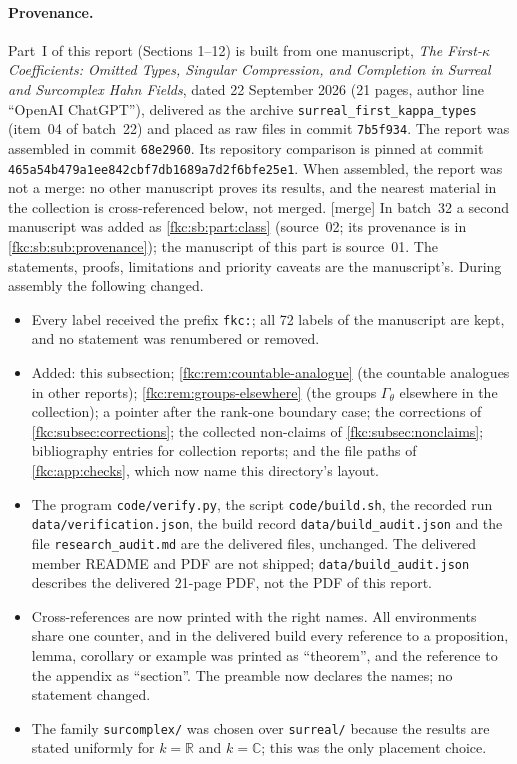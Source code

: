 \documentclass[11pt,letterpaper]{article}
\numberwithin{equation}{section}
\theoremstyle{definition}
\theoremstyle{remark}
\newcommand{\R}{\mathbb R}
\newcommand{\C}{\mathbb C}
\newcommand{\mergetag}{\textup{\textsf{\small[merge]}}}%
\begin{document}
\paragraph{Provenance.}
Part~I of this report (Sections 1--12) is built from one manuscript, \emph{The First-$\kappa$ Coefficients: Omitted Types, Singular Compression, and Completion in Surreal and Surcomplex Hahn Fields}, dated 22 September 2026 (21 pages, author line ``OpenAI ChatGPT''), delivered as the archive \texttt{surreal\_first\_kappa\_types} (item~04 of batch~22) and placed as raw files in commit \texttt{7b5f934}. The report was assembled in commit \texttt{68e2960}. Its repository comparison is pinned at commit \texttt{465a54b479a1ee842cbf7db1689a7d2f6bfe25e1}. When assembled, the report was not a merge: no other manuscript proves its results, and the nearest material in the collection is cross-referenced below, not merged. \mergetag{} In batch~32 a second manuscript was added as \cref{fkc:sb:part:class} (source~02; its provenance is in \cref{fkc:sb:sub:provenance}); the manuscript of this part is source~01. The statements, proofs, limitations and priority caveats are the manuscript's. During assembly the following changed.
\begin{itemize}
\item Every label received the prefix \texttt{fkc:}; all 72 labels of the manuscript are kept, and no statement was renumbered or removed.
\item Added: this subsection; \cref{fkc:rem:countable-analogue} (the countable analogues in other reports); \cref{fkc:rem:groups-elsewhere} (the groups $\Gamma_\theta$ elsewhere in the collection); a pointer after the rank-one boundary case; the corrections of \cref{fkc:subsec:corrections}; the collected non-claims of \cref{fkc:subsec:nonclaims}; bibliography entries for collection reports; and the file paths of \cref{fkc:app:checks}, which now name this directory's layout.
\item The program \texttt{code/verify.py}, the script \texttt{code/build.sh}, the recorded run \texttt{data/verification.json}, the build record \texttt{data/build\_audit.json} and the file \texttt{research\_audit.md} are the delivered files, unchanged. The delivered member README and PDF are not shipped; \texttt{data/build\_audit.json} describes the delivered 21-page PDF, not the PDF of this report.
\item Cross-references are now printed with the right names. All environments share one counter, and in the delivered build every reference to a proposition, lemma, corollary or example was printed as ``theorem'', and the reference to the appendix as ``section''. The preamble now declares the names; no statement changed.
\item The family \texttt{surcomplex/} was chosen over \texttt{surreal/} because the results are stated uniformly for $k=\R$ and $k=\C$; this was the only placement choice.
\end{itemize}
\end{document}
